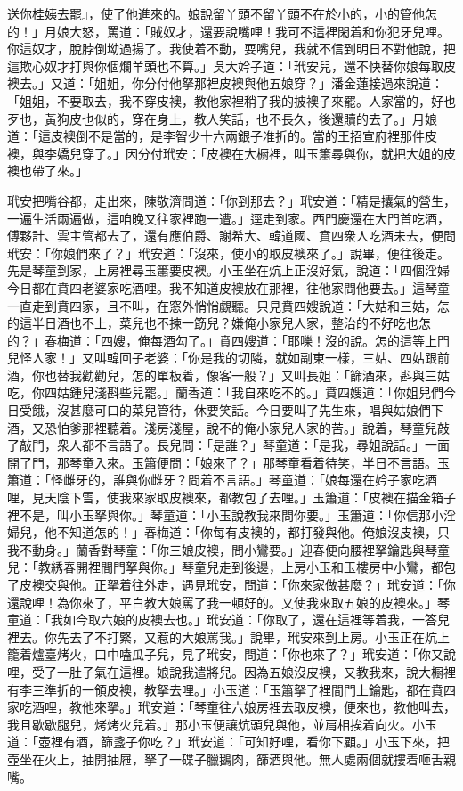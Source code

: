 送你桂姨去罷』，使了他進來的。娘說留丫頭不留丫頭不在於小的，小的管他怎的！」月娘大怒，罵道：「賊奴才，還要說嘴哩！我可不這裡閑着和你犯牙兒哩。你這奴才，脫脖倒坳過揚了。我使着不動，耍嘴兒，我就不信到明日不對他說，把這欺心奴才打與你個爛羊頭也不算。」吳大妗子道：「玳安兒，還不快替你娘每取皮襖去。」又道：「姐姐，你分付他拏那裡皮襖與他五娘穿？」潘金蓮接過來說道：「姐姐，不要取去，我不穿皮襖，教他家裡稍了我的披襖子來罷。人家當的，好也歹也，黃狗皮也似的，{}穿在身上，教人笑話，也不長久，後還贖的去了。」{}月娘道：「這皮襖倒不是當的，是李智少十六兩銀子准折的。當的王招宣府裡那件皮襖，與李嬌兒穿了。」因分付玳安：「皮襖在大橱裡，叫玉簫尋與你，就把大姐的皮襖也帶了來。」

玳安把嘴谷都，走出來，陳敬濟問道：「你到那去？」玳安道：「精是攮氣的營生，一遍生活兩遍做，這咱晚又往家裡跑一遭。」逕走到家。西門慶還在大門首吃酒，傅夥計、雲主管都去了，還有應伯爵、謝希大、韓道國、賁四衆人吃酒未去，便問玳安：「你娘們來了？」玳安道：「沒來，使小的取皮襖來了。」說畢，便往後走。先是琴童到家，上房裡尋玉簫要皮襖。小玉坐在炕上正沒好氣，說道：「四個淫婦今日都在賁四老婆家吃酒哩。我不知道皮襖放在那裡，往他家問他要去。」這琴童一直走到賁四家，且不叫，在窓外悄悄覷聽。只見賁四嫂說道：「大姑和三姑，怎的這半日酒也不上，菜兒也不揀一筯兒？嫌俺小家兒人家，整治的不好吃也怎的？」春梅道：「四嫂，俺每酒勾了。」賁四嫂道：「耶嚛！沒的說。怎的這等上門兒怪人家！」又叫韓回子老婆：「你是我的切隣，就如副東一樣，三姑、四姑跟前酒，你也替我勸勸兒，怎的單板着，像客一般？」又叫長姐：「篩酒來，斟與三姑吃，你四姑鍾兒淺斟些兒罷。」蘭香道：「我自來吃不的。」賁四嫂道：「你姐兒們今日受餓，沒甚麼可口的菜兒管待，休要笑話。今日要叫了先生來，唱與姑娘們下酒，又恐怕爹那裡聽着。淺房淺屋，說不的俺小家兒人家的苦。」說着，琴童兒敲了敲門，衆人都不言語了。長兒問：「是誰？」琴童道：「是我，尋姐說話。」一面開了門，那琴童入來。玉簫便問：「娘來了？」那琴童看着待笑，半日不言語。玉簫道：「怪雌牙的，誰與你雌牙？問着不言語。」琴童道：「娘每還在妗子家吃酒哩，見天陰下雪，使我來家取皮襖來，都教包了去哩。」玉簫道：「皮襖在描金箱子裡不是，叫小玉拏與你。」琴童道：「小玉說教我來問你要。」玉簫道：「你信那小淫婦兒，他不知道怎的！」春梅道：「你每有皮襖的，都打發與他。俺娘沒皮襖，只我不動身。」蘭香對琴童：「你三娘皮襖，問小鸞要。」迎春便向腰裡拏鑰匙與琴童兒：「教綉春開裡間門拏與你。」琴童兒走到後邊，上房小玉和玉樓房中小鸞，都包了皮襖交與他。正拏着往外走，遇見玳安，問道：「你來家做甚麼？」玳安道：「你還說哩！為你來了，平白教大娘罵了我一頓好的。又使我來取五娘的皮襖來。」琴童道：「我如今取六娘的皮襖去也。」玳安道：「你取了，還在這裡等着我，一答兒裡去。你先去了不打緊，又惹的大娘罵我。」說畢，玳安來到上房。小玉正在炕上籠着爐臺烤火，口中嗑瓜子兒，見了玳安，問道：「你也來了？」玳安道：「你又說哩，受了一肚子氣在這裡。娘說我遣將兒。因為五娘沒皮襖，又教我來，說大橱裡有李三準折的一領皮襖，教拏去哩。」小玉道：「玉簫拏了裡間門上鑰匙，都在賁四家吃酒哩，教他來拏。」玳安道：「琴童往六娘房裡去取皮襖，便來也，教他叫去，我且歇歇腿兒，烤烤火兒着。」那小玉便讓炕頭兒與他，並肩相挨着向火。小玉道：「壺裡有酒，篩盞子你吃？」玳安道：「可知好哩，看你下顧。」小玉下來，把壺坐在火上，抽開抽屜，拏了一碟子臘鵝肉，篩酒與他。無人處兩個就摟着咂舌親嘴。

